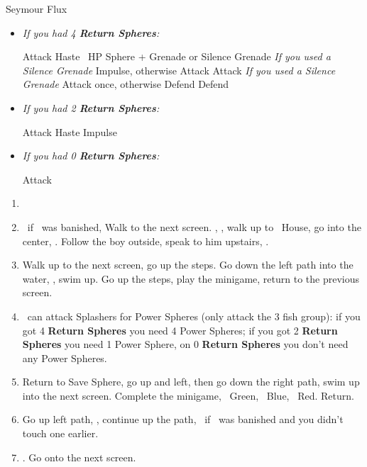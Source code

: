 \begin{battle}[70000]{Seymour Flux}
    \begin{itemize}
        \item \textit{If you had 4 \textbf{Return Spheres}:}
        \begin{itemize}
            \yunaf Attack
            \tidusf Haste \yuna
            \switch{\auron}{\rikku}
            \rikkuf \od\ HP Sphere + Grenade or Silence Grenade
            \summon{\bahamut}
            \bahamutf \textit{If you used a Silence Grenade} Impulse, otherwise Attack
            \yunaf Attack
            \tidusf \textit{If you used a Silence Grenade} Attack once, otherwise Defend
            \rikkuf Defend
        \end{itemize}
        \item \textit{If you had 2 \textbf{Return Spheres}:}
        \begin{itemize}
            \yunaf Attack
            \tidusf Haste \yuna
            \summon{\bahamut}
            \bahamutf Impulse
        \end{itemize}
        \item \textit{If you had 0 \textbf{Return Spheres}:}
        \begin{itemize}
            \switch{\tidus}{\yuna}
            \summon{\bahamut}
            \bahamutf Attack
        \end{itemize}
    \end{itemize}
\end{battle}
\begin{enumerate}[resume]
    \item \formation{\tidus}{\kimahri}{\auron}
    \item \save\ if \bahamut\ was banished, Walk to the next screen. \skippablefmv[0:20], \sd, walk up to \tidus\ House, go into the center, \sd. Follow the boy outside, speak to him upstairs, \sd.
    \item Walk up to the next screen, go up the steps. Go down the left path into the water, \sd, swim up. Go up the steps, play the minigame, return to the previous screen.
    \item \tidus\ can attack Splashers for Power Spheres (only attack the 3 fish group): if you got 4 \textbf{Return Spheres} you need 4 Power Spheres; if you got 2 \textbf{Return Spheres} you need 1 Power Sphere, on 0 \textbf{Return Spheres} you don't need any Power Spheres.
    \item Return to Save Sphere, go up and left, then go down the right path, swim up into the next screen. Complete the minigame, \rikku\ Green, \tidus\ Blue, \wakka\ Red. Return.
    \item Go up left path, \sd, continue up the path, \save\ if \bahamut\ was banished and you didn't touch one earlier.
    \item \formation{\tidus}{\yuna}{\wakka}. Go onto the next screen.
\end{enumerate}
